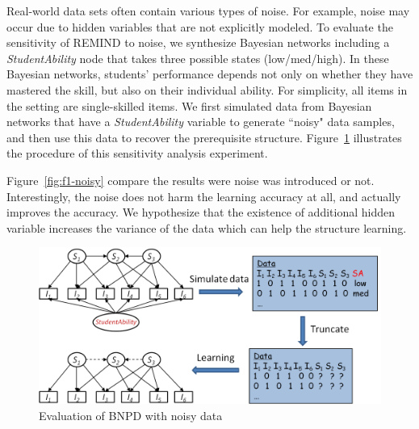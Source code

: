 \documentclass{edm_template}
\newcommand{\hl}[1]{\colorbox{yellow}{#1}}
\begin{document}
{	%
	Real-world data sets often contain various types of noise.
	For example,  noise may occur due to hidden variables that are not explicitly modeled. 
	To evaluate the sensitivity of REMIND to noise, we synthesize Bayesian networks including a  \emph{StudentAbility} node that takes three possible states (low/med/high). 
	In these Bayesian networks, students' performance depends not only on whether they have mastered the skill, but also on their individual ability. %
	For simplicity, all items in the setting are single-skilled items. 
	We first simulated data from  Bayesian networks that have a  \emph{StudentAbility} variable to generate ``noisy" data samples, and 
	then use this data to recover the prerequisite structure. %
	Figure~\ref{fig:stuabilitymodel} illustrates the procedure of this sensitivity analysis experiment.
	
	Figure~\ref{fig:f1-noisy} compare the results were noise was introduced or not.
	Interestingly, the noise does not harm the learning accuracy at all, and actually improves the accuracy.
	We hypothesize that the existence of additional hidden variable increases the variance of the data which can help the structure learning.
	
	\begin{figure}[!ht]
		\begin{center}
			\includegraphics[width=1.0\linewidth]{figures/studentability.png}
		\end{center}
		\caption{Evaluation of BNPD with noisy data} 
		\label{fig:stuabilitymodel}
	\end{figure}
	
}
\end{document}
